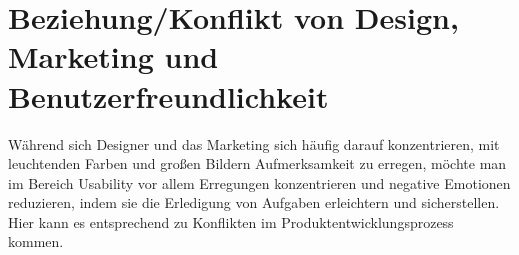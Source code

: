 \documentclass[./dokumentation.tex]{subfiles}
\begin{document}
\section{Beziehung/Konflikt von Design, Marketing und Benutzerfreundlichkeit}
Während sich Designer und das Marketing sich häufig darauf konzentrieren, mit leuchtenden Farben und großen Bildern Aufmerksamkeit zu erregen, möchte man im Bereich Usability vor allem Erregungen konzentrieren und negative Emotionen reduzieren, indem sie die Erledigung von Aufgaben erleichtern und sicherstellen. Hier kann es entsprechend zu Konflikten im Produktentwicklungsprozess kommen. 
\end{document}
